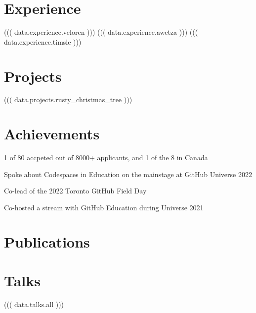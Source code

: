 \documentclass[]{deedy-resume-openfont}
\begin{document}
\begin{minipage}[t]{0.66\textwidth}


\section{Experience}

((( data.experience.veloren )))
((( data.experience.awetza )))
((( data.experience.timsle )))

\section{Projects}

((( data.projects.rusty_christmas_tree )))

\section{Achievements}

\begin{tightemize}
\item 1 of 80 accpeted out of 8000+ applicants, and 1 of the 8 in Canada
\item Spoke about Codespaces in Education on the mainstage at GitHub Universe 2022
\item Co-lead of the 2022 Toronto GitHub Field Day
\item Co-hosted a stream with GitHub Education during Universe 2021
\end{tightemize}
\sectionsep


\section{Publications} 
\renewcommand\refname{\vskip -1.5em} %


\nocite{*}

\section{Talks}

((( data.talks.all )))

\end{minipage} 
\end{document}
